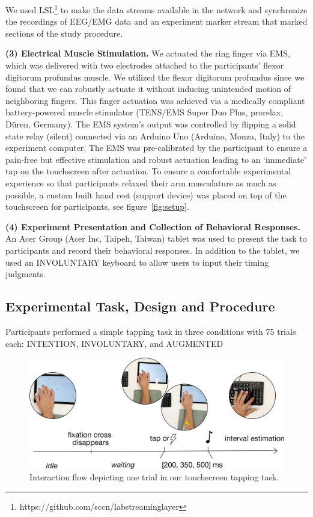 We used LSL\footnote{https://github.com/sccn/labstreaminglayer} to make the data streams available in the network and synchronize the recordings of EEG/EMG data and an experiment marker stream that marked sections of the study procedure.

\indent\textbf{(3) Electrical Muscle Stimulation.} We actuated the ring finger via EMS, which was delivered with two electrodes attached to the participants' flexor digitorum profundus muscle. We utilized the flexor digitorum profundus since we found that we can robustly actuate it without inducing unintended motion of neighboring fingers. This finger actuation was achieved via a medically compliant battery-powered muscle stimulator (TENS/EMS Super Duo Plus, prorelax, Düren, Germany). The EMS system's output was controlled by flipping a solid state relay (silent) connected via an Arduino Uno (Arduino, Monza, Italy) to the experiment computer. The EMS was pre-calibrated by the participant to ensure a pain-free but effective stimulation and robust actuation leading to an `immediate' tap on the touchscreen after actuation. To ensure a comfortable experimental experience so that participants relaxed their arm musculature as much as possible, a custom built hand rest (support device) was placed on top of the touchscreen for participants, see figure~\ref{fig:setup}.

\indent\textbf{(4) Experiment Presentation and Collection of Behavioral Responses.} An Acer Group (Acer Inc, Taipeh, Taiwan) tablet was used to present the task to participants and record their behavioral responses. In addition to the tablet, we used an INVOLUNTARY keyboard to allow users to input their timing judgments.

\subsection{Experimental Task, Design and Procedure}
Participants performed a simple tapping task in three conditions with 75 trials each: INTENTION, INVOLUNTARY, and AUGMENTED

\begin{figure}[h]
    \centering
    \includegraphics[width=\columnwidth]{figures/task_new.pdf}
    \caption{Interaction flow depicting one trial in our touchscreen tapping task.}
    \label{fig:progression}
\end{figure}

